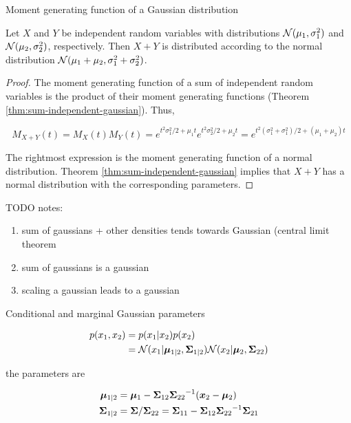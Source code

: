 \begin{thm} Moment generating function of a Gaussian distribution

\end{thm}

\begin{thm}
Let $X$ and $Y$ be independent random variables with distributions ${\mathcal{N}}(\mu_1, \sigma_1^2)$ and ${\mathcal{N}}(\mu_2, \sigma_2^2)$, respectively. Then $X + Y$ is distributed according to the normal distribution ${\mathcal{N}}(\mu_1 + \mu_2, \sigma_1^2 + \sigma_2^2)$.
\end{thm}
\begin{proof}
The moment generating function of a sum of independent random variables is the product of their moment generating functions (Theorem \ref{thm:sum-independent-gaussian}). Thus,

\begin{equation}
M_{X + Y}(t) = M_X(t) M_Y(t) = e^{t^2 \sigma_1^2 / 2 + \mu_1 t} e^{t^2 \sigma_2^2 / 2 + \mu_2 t} = e^{t^2 (\sigma_1^2 + \sigma_1^2) / 2 + (\mu_1 + \mu_2) t}
\end{equation}

The rightmost expression is the moment generating function of a normal distribution. Theorem \ref{thm:sum-independent-gaussian} implies that $X + Y$ has a normal distribution with the corresponding parameters. 
\end{proof}

\citep{eisenberg2008sum} 

TODO notes:

\begin{enumerate}
\item sum of gaussians + other densities tends towards Gaussian (central limit theorem\
\item sum of gaussians is a gaussian
\item scaling a gaussian leads to a gaussian
\end{enumerate}


\begin{thm} Conditional and marginal Gaussian parameters \citep{murphy2012machine} 

\begin{align}
p(x_1, x_2) &= p(x_1 | x_2) p(x_2) \\
&= {\mathcal{N}}(x_1 | {\bm{\mu}}_{1|2}, {{\bm{\Sigma}}_{1|2}}) {\mathcal{N}}(x_2 | {\bm{\mu}}_2, {{\bm{\Sigma}}_{22}})
\end{align}

the parameters are 

\begin{align}
{\bm{\mu}}_{1|2} &= {\bm{\mu}}_1 - {{\bm{\Sigma}}_{12}} {{\bm{\Sigma}}_{22}}^{-1} ({\bm{x}}_2 - {\bm{\mu}}_2) \\
{{\bm{\Sigma}}_{1|2}} &= {\bm{\Sigma}} / {{\bm{\Sigma}}_{22}} = {{\bm{\Sigma}}_{11}} - {{\bm{\Sigma}}_{12}} {{\bm{\Sigma}}_{22}}^{-1} {{\bm{\Sigma}}_{21}}
\end{align}
\end{thm}

